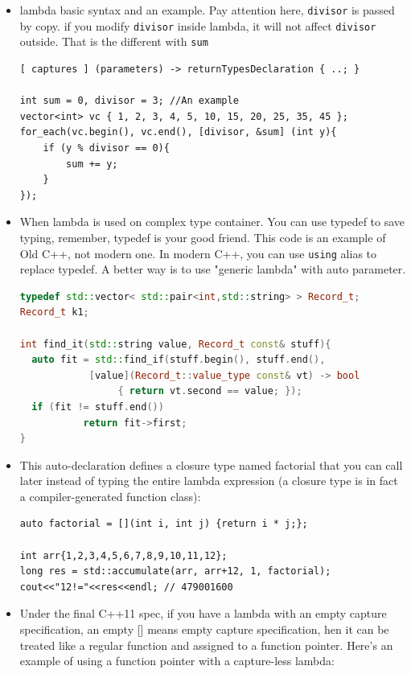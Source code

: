 \documentclass[a4paper,11pt,twoside]{book}
\begin{document}
\begin{itemize}
		\item lambda basic syntax and an example. Pay attention here, \texttt{divisor} is passed by copy. if you modify \texttt{divisor} inside lambda, it will not affect \texttt{divisor} outside. That is the different with \texttt{sum}

\begin{lstlisting}
[ captures ] (parameters) -> returnTypesDeclaration { ..; }

int sum = 0, divisor = 3; //An example
vector<int> vc { 1, 2, 3, 4, 5, 10, 15, 20, 25, 35, 45 };
for_each(vc.begin(), vc.end(), [divisor, &sum] (int y){
	if (y % divisor == 0){
		sum += y;
	}
});
\end{lstlisting}

		\item When lambda is used on complex type container. You can use typedef to save typing, remember, typedef is your good friend. This code is an example of Old C++, not modern one. In modern C++, you can use \texttt{using} alias to replace typedef. A better way is to use "generic lambda" with auto parameter. 
\begin{lstlisting}[frame=single, language=c++, mathescape=true]
typedef std::vector< std::pair<int,std::string> > Record_t;
Record_t k1;

int find_it(std::string value, Record_t const& stuff){
  auto fit = std::find_if(stuff.begin(), stuff.end(),
            [value](Record_t::value_type const& vt) -> bool 
                 { return vt.second == value; });
  if (fit != stuff.end())
           return fit->first;
}
\end{lstlisting}

		\item This auto-declaration defines a closure type named factorial that you can call later instead of typing the entire lambda expression (a closure type is in fact a compiler-generated function class):
\begin{lstlisting}[numbers=none]
auto factorial = [](int i, int j) {return i * j;};

int arr{1,2,3,4,5,6,7,8,9,10,11,12};
long res = std::accumulate(arr, arr+12, 1, factorial);
cout<<"12!="<<res<<endl; // 479001600
\end{lstlisting}

		\item Under the final C++11 spec, if you have a lambda with an empty capture specification, an empty [] means empty capture specification, hen it can be treated like a regular function and assigned to a function pointer. Here's an example of using a function pointer with a capture-less lambda:


\end{itemize}
\end{document}
